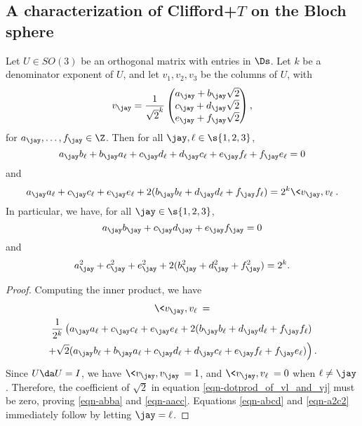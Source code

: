 
\subsection{A characterization of Clifford+$T$ on the Bloch sphere} %
\label{sub:a_characterization_of_clifford_t_on_the_bloch_sphere}
\begin{lemma}\label{lem:dot_product_is_simpler_in_ds}
  Let $U\in SO(3)$ be an orthogonal matrix with entries in $\Ds$. Let $k$ be a denominator exponent
  of $U$, and let $v_1,v_2,v_3$ be the columns of $U$, with
  \[v_\jay = \frac{1}{\sqrt{2}^k}\left(\begin{matrix}
      a_\jay+b_\jay\sqrt{2} \\
      c_\jay+d_\jay\sqrt{2} \\
      e_\jay+f_\jay\sqrt{2}
    \end{matrix}\right),\]
  for $a_\jay,\ldots,f_\jay\in\Z$.
  Then for all $\jay,\ell\in\s{1,2,3}$,
  \begin{equation}\label{eqn-abba}
    a_\jay b_\ell+b_\jay a_\ell+
            c_\jay d_\ell+d_\jay c_\ell+e_\jay f_\ell+f_\jay e_\ell = 0
  \end{equation}
  and
  \begin{equation}\label{eqn-aacc}
    a_\jay a_\ell+c_\jay c_\ell+e_\jay e_\ell+
    2(b_\jay b_\ell+d_\jay d_\ell+f_\jay f_\ell)
    = 2^k\<v_\jay,v_\ell\>.
  \end{equation}
  In particular, we have, for all $\jay\in\s{1,2,3}$,
  \begin{equation}\label{eqn-abcd}
    a_\jay b_\jay+
    c_\jay d_\jay+e_\jay f_\jay = 0
  \end{equation}
  and
  \begin{equation}\label{eqn-a2c2}
    a_\jay^2 + c_\jay^2 + e_\jay^2 + 2(b_\jay^2 + d_\jay^2 + f_\jay^2) = 2^k.
  \end{equation}
\end{lemma}

\begin{proof}
  Computing the inner product, we have
  \begin{multline}  \label{eqn-dotprod_of_vl_and_vj}
    \<v_\jay,v_\ell\> =\\
    \frac{1}{2^k}
    \left(
      a_\jay a_\ell+c_\jay c_\ell+e_\jay e_\ell+
      2(b_\jay b_\ell+d_\jay d_\ell+f_\jay f_\ell) \right. \\
      \left.
      +\sqrt{2}(a_\jay b_\ell+b_\jay a_\ell+
      c_\jay d_\ell+d_\jay c_\ell+e_\jay f_\ell+f_\jay e_\ell)
    \right).
  \end{multline}
  Since $U\da U=I$, we have $\<v_\jay,v_\jay\>=1$, and $\<v_\jay,v_\ell\> = 0$ when $\ell \ne
  \jay$. Therefore, the coefficient of $\sqrt{2}$ in equation \vref{eqn-dotprod_of_vl_and_vj} must
  be zero, proving \vref{eqn-abba} and \vref{eqn-aacc}. Equations {\vref{eqn-abcd}} and
  {\vref{eqn-a2c2}} immediately follow by letting $\jay=\ell$.
\end{proof}

